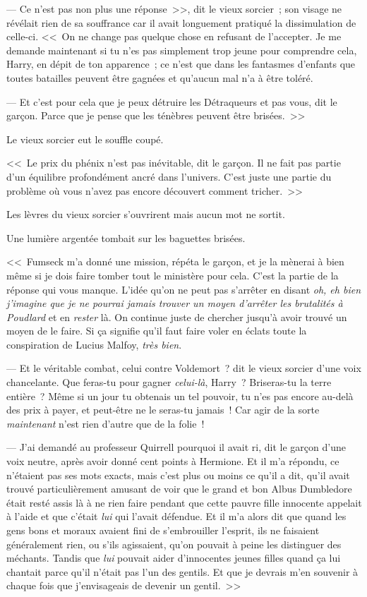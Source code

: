 --- Ce n'est pas non plus une réponse~>>, dit le vieux sorcier~; son visage ne révélait rien de sa souffrance car il avait longuement pratiqué la dissimulation de celle-ci. <<~On ne change pas quelque chose en refusant de l'accepter. Je me demande maintenant si tu n'es pas simplement trop jeune pour comprendre cela, Harry, en dépit de ton apparence~; ce n'est que dans les fantasmes d'enfants que toutes batailles peuvent être gagnées et qu'aucun mal n'a à être toléré.

--- Et c'est pour cela que je peux détruire les Détraqueurs et pas vous, dit le garçon. Parce que je pense que les ténèbres peuvent être brisées.~>>

Le vieux sorcier eut le souffle coupé.

<<~Le prix du phénix n'est pas inévitable, dit le garçon. Il ne fait pas partie d'un équilibre profondément ancré dans l'univers. C'est juste une partie du problème où vous n'avez pas encore découvert comment tricher.~>>

Les lèvres du vieux sorcier s'ouvrirent mais aucun mot ne sortit.

Une lumière argentée tombait sur les baguettes brisées.

<<~Fumseck m'a donné une mission, répéta le garçon, et je la mènerai à bien même si je dois faire tomber tout le ministère pour cela. C'est la partie de la réponse qui vous manque. L'idée qu'on ne peut pas s'arrêter en disant \emph{oh, eh bien j'imagine que je ne pourrai jamais trouver un moyen d'arrêter les brutalités à Poudlard} et en \emph{rester} là. On continue juste de chercher jusqu'à avoir trouvé un moyen de le faire. Si ça signifie qu'il faut faire voler en éclats toute la conspiration de Lucius Malfoy, \emph{très bien}.

--- Et le véritable combat, celui contre Voldemort~? dit le vieux sorcier d'une voix chancelante. Que feras-tu pour gagner \emph{celui-là}, Harry~? Briseras-tu la terre entière~? Même si un jour tu obtenais un tel pouvoir, tu n'es pas encore au-delà des prix à payer, et peut-être ne le seras-tu jamais~! Car agir de la sorte \emph{maintenant} n'est rien d'autre que de la folie~!

--- J'ai demandé au professeur Quirrell pourquoi il avait ri, dit le garçon d'une voix neutre, après avoir donné cent points à Hermione. Et il m'a répondu, ce n'étaient pas ses mots exacts, mais c'est plus ou moins ce qu'il a dit, qu'il avait trouvé particulièrement amusant de voir que le grand et bon Albus Dumbledore était resté assis là à ne rien faire pendant que cette pauvre fille innocente appelait à l'aide et que c'était \emph{lui} qui l'avait défendue. Et il m'a alors dit que quand les gens bons et moraux avaient fini de s'embrouiller l'esprit, ils ne faisaient généralement rien, ou s'ils agissaient, qu'on pouvait à peine les distinguer des méchants. Tandis que \emph{lui} pouvait aider d'innocentes jeunes filles quand ça lui chantait parce qu'il n'était pas l'un des gentils. Et que je devrais m'en souvenir à chaque fois que j'envisageais de devenir un gentil.~>>

